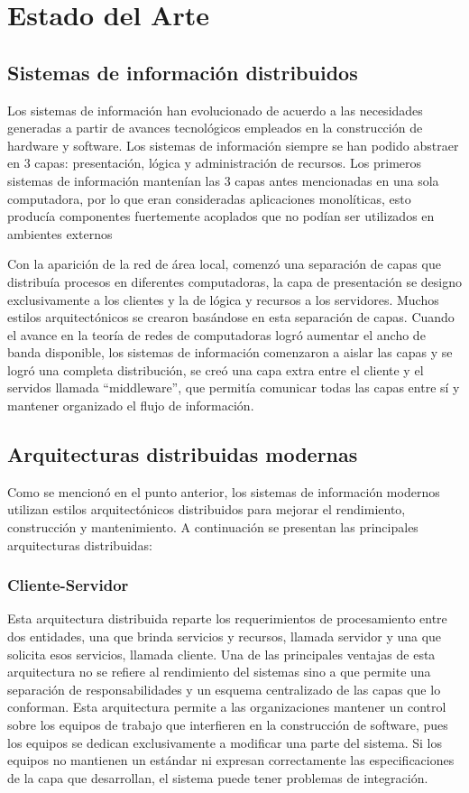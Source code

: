 \section{ Estado del Arte }

\subsection{ Sistemas de información distribuidos }
Los sistemas de información han evolucionado de acuerdo a las necesidades generadas a partir de avances tecnológicos empleados en la construcción de hardware y software. Los sistemas de información siempre se han podido abstraer en 3 capas: presentación, lógica y administración de recursos.
Los primeros sistemas de información mantenían las 3 capas antes mencionadas en una sola computadora, por lo que eran consideradas aplicaciones monolíticas, esto producía componentes fuertemente acoplados que no podían ser utilizados en ambientes externos


Con la aparición de la red de área local, comenzó una separación de capas que distribuía procesos en diferentes computadoras, la capa de presentación se designo exclusivamente a los clientes y la de lógica y recursos a los servidores. Muchos estilos arquitectónicos se crearon basándose en esta separación de capas.
Cuando el avance en la teoría de redes de computadoras logró aumentar el ancho de banda disponible, los sistemas de información comenzaron a aislar las capas y se logró una completa distribución, se creó una capa extra entre el cliente y el servidos llamada “middleware”, que permitía comunicar todas las capas entre sí y mantener organizado el flujo de información.

\subsection{ Arquitecturas distribuidas modernas }
Como se mencionó en el punto anterior, los sistemas de información modernos utilizan estilos arquitectónicos distribuidos para mejorar el rendimiento, construcción y mantenimiento. A continuación se presentan las principales arquitecturas distribuidas: 

\subsubsection{ Cliente-Servidor }
Esta arquitectura distribuida reparte los requerimientos de procesamiento entre dos entidades, una que brinda servicios y recursos, llamada servidor y una que solicita esos servicios, llamada cliente.
Una de las principales ventajas de esta arquitectura no se refiere al rendimiento del sistemas sino a que permite una separación de responsabilidades y un esquema centralizado de las capas que lo conforman. Esta arquitectura permite a las organizaciones mantener un control sobre los equipos de trabajo que interfieren en la construcción de software, pues los equipos se dedican exclusivamente a modificar una parte del sistema. Si los equipos no mantienen un estándar ni expresan correctamente las especificaciones de la capa que desarrollan, el sistema puede tener problemas de integración.

